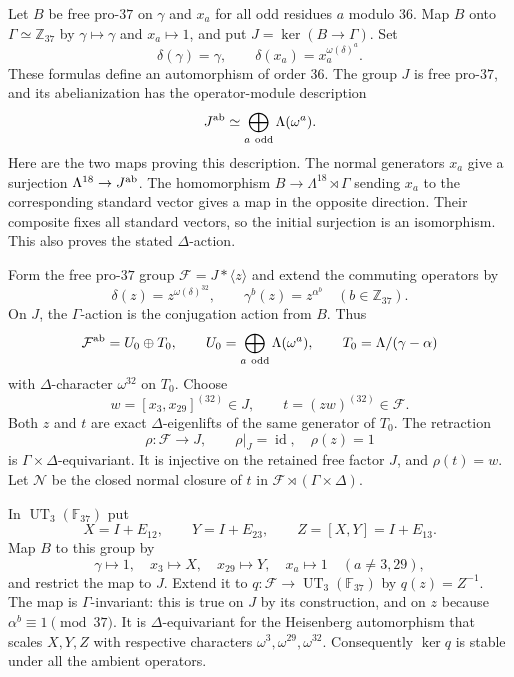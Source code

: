 Let $B$ be free pro-$37$ on $\gamma$ and $x_a$ for all odd
residues $a$ modulo $36$.  Map $B$ onto $\Gamma\simeq\mathbb Z_{37}$
by $\gamma\mapsto\gamma$ and $x_a\mapsto1$, and put
$J=\ker(B\to\Gamma)$.  Set
\[
 \delta(\gamma)=\gamma,\qquad
 \delta(x_a)=x_a^{\omega(\delta)^a}.
\]
These formulas define an automorphism of order $36$.
The group $J$ is free pro-$37$, and its abelianization has the
operator-module description
\[
 J^{\rm ab}\simeq\bigoplus_{a\ \mathrm{odd}}\Lambda(\omega^a).
\]
Here are the two maps proving this description.  The normal
generators $x_a$ give a surjection $\Lambda^{18}\to J^{\rm ab}$.
The homomorphism $B\to\Lambda^{18}\rtimes\Gamma$ sending
$x_a$ to the corresponding standard vector gives a map in the
opposite direction.  Their composite fixes all standard vectors,
so the initial surjection is an isomorphism.  This also proves
the stated $\Delta$-action.

Form the free pro-$37$ group $\mathcal F=J*\langle z\rangle$
and extend the commuting operators by
\[
 \delta(z)=z^{\omega(\delta)^{32}},\qquad
 \gamma^b(z)=z^{\alpha^b}\quad(b\in\mathbb Z_{37}).
\]
On $J$, the $\Gamma$-action is the conjugation action from $B$.
Thus
\[
 \mathcal F^{\rm ab}=U_0\oplus T_0,
 \qquad
 U_0=\bigoplus_{a\ \mathrm{odd}}\Lambda(\omega^a),\qquad
 T_0=\Lambda/(\gamma-\alpha)
\]
with $\Delta$-character $\omega^{32}$ on $T_0$.
Choose
\[
 w=[x_3,x_{29}]^{(32)}\in J,
 \qquad t=(zw)^{(32)}\in\mathcal F.
\]
Both $z$ and $t$ are exact $\Delta$-eigenlifts of the same
generator of $T_0$.  The retraction
\[
 \rho:\mathcal F\longrightarrow J,\qquad
 \rho|_J=\operatorname{id},\quad\rho(z)=1
\]
is $\Gamma\times\Delta$-equivariant.  It is injective on the
retained free factor $J$, and $\rho(t)=w$.
Let $\mathcal N$ be the closed normal closure of $t$ in
$\mathcal F\rtimes(\Gamma\times\Delta)$.

In $\operatorname{UT}_3(\mathbb F_{37})$ put
\[
 X=I+E_{12},\qquad Y=I+E_{23},\qquad
 Z=[X,Y]=I+E_{13}.
\]
Map $B$ to this group by
\[
 \gamma\mapsto1,\quad x_3\mapsto X,\quad x_{29}\mapsto Y,
 \quad x_a\mapsto1\quad(a\ne3,29),
\]
and restrict the map to $J$.  Extend it to
$q:\mathcal F\to\operatorname{UT}_3(\mathbb F_{37})$ by
$q(z)=Z^{-1}$.  The map is $\Gamma$-invariant: this is true
on $J$ by its construction, and on $z$ because
$\alpha^b\equiv1\pmod{37}$.  It is $\Delta$-equivariant for
the Heisenberg automorphism that scales $X,Y,Z$ with respective
characters $\omega^3,\omega^{29},\omega^{32}$.
Consequently $\ker q$ is stable under all the ambient operators.


